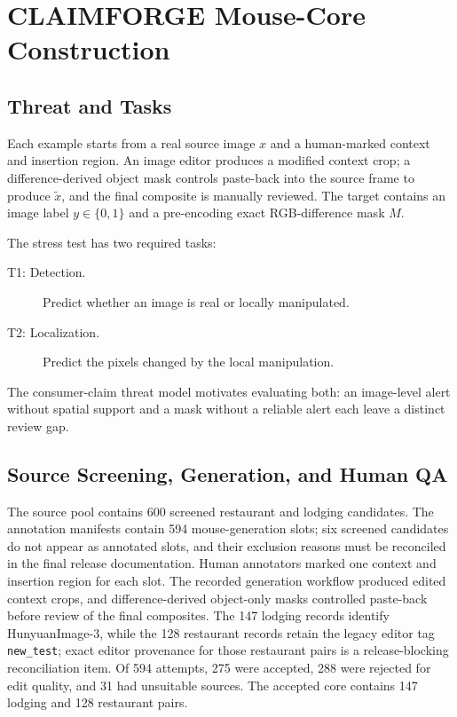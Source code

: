 \section{CLAIMFORGE Mouse-Core Construction}
\label{sec:benchmark}

\subsection{Threat and Tasks}

Each example starts from a real source image $x$ and a human-marked context and insertion region. An image editor produces a modified context crop; a difference-derived object mask controls paste-back into the source frame to produce $\tilde{x}$, and the final composite is manually reviewed. The target contains an image label $y\in\{0,1\}$ and a pre-encoding exact RGB-difference mask $M$.

The stress test has two required tasks:
\begin{description}
    \item[T1: Detection.] Predict whether an image is real or locally manipulated.
    \item[T2: Localization.] Predict the pixels changed by the local manipulation.
\end{description}
The consumer-claim threat model motivates evaluating both: an image-level alert without spatial support and a mask without a reliable alert each leave a distinct review gap.

\subsection{Source Screening, Generation, and Human QA}

The source pool contains 600 screened restaurant and lodging candidates. The annotation manifests contain 594 mouse-generation slots; six screened candidates do not appear as annotated slots, and their exclusion reasons must be reconciled in the final release documentation. Human annotators marked one context and insertion region for each slot. The recorded generation workflow produced edited context crops, and difference-derived object-only masks controlled paste-back before review of the final composites. The 147 lodging records identify HunyuanImage-3, while the 128 restaurant records retain the legacy editor tag \texttt{new\_test}; exact editor provenance for those restaurant pairs is a release-blocking reconciliation item. Of 594 attempts, 275 were accepted, 288 were rejected for edit quality, and 31 had unsuitable sources. The accepted core contains 147 lodging and 128 restaurant pairs.

